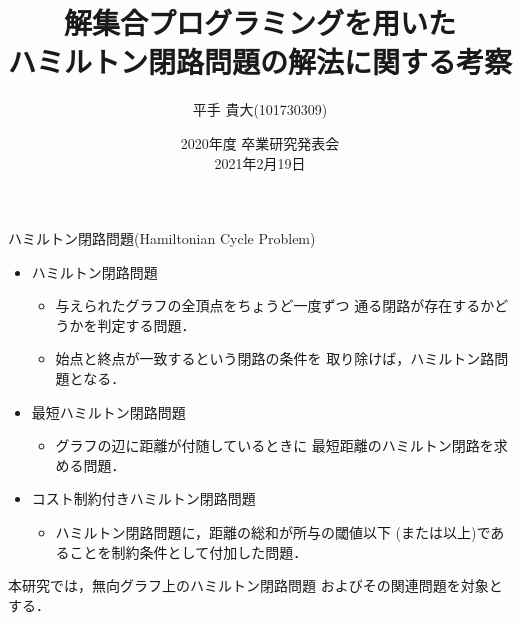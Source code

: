 \documentclass[dvipdfmx,11pt]{beamer}
\title{解集合プログラミングを用いた\\ハミルトン閉路問題の解法に関する考察}
\author{平手 貴大(101730309)}
\institute{名古屋大学情報学部コンピュータ科学科情報システム系\\番原研究室}
\date{2020年度 卒業研究発表会\\2021年2月19日}
\begin{document}

\frame{\maketitle}

\begin{frame}{ハミルトン閉路問題(Hamiltonian Cycle Problem)}
  \begin{itemize}
  \item \alert{ハミルトン閉路問題}
    \begin{itemize}
    \item 与えられたグラフの全頂点をちょうど一度ずつ
      通る閉路が存在するかどうかを判定する問題．
    \item 始点と終点が一致するという閉路の条件を
      取り除けば，ハミルトン路問題となる．
    \end{itemize}
  \item \alert{最短ハミルトン閉路問題}
    \begin{itemize}
    \item グラフの辺に距離が付随しているときに
      最短距離のハミルトン閉路を求める問題．
    \end{itemize}
  \item \alert{コスト制約付きハミルトン閉路問題}
    \begin{itemize}
    \item ハミルトン閉路問題に，距離の総和が所与の閾値以下
      (または以上)であることを制約条件として付加した問題．
    \end{itemize}
  \end{itemize}
  \begin{alertblock}{}
    本研究では，無向グラフ上のハミルトン閉路問題
    およびその関連問題を対象とする．    
  \end{alertblock}
\end{frame}
\end{document}
